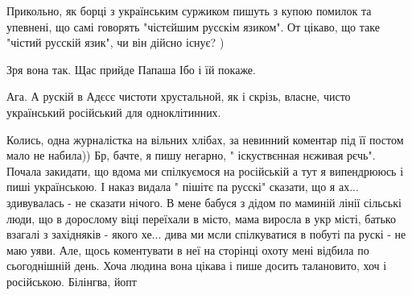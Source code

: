  

Прикольно, як борці з українським суржиком пишуть з купою помилок та упевнені,
що самі говорять "чістєйшим русскім язиком". От цікаво, що таке "чістий русскій
язик", чи він дійсно існує? )


 
Зря вона так. Щас прийде Папаша Ібо і їй покаже.

 
Ага. А рускій в Адєсє чистоти хрустальной, як і скрізь, власне, чисто
український російський для одноклітинних.

 

Колись, одна журналістка на вільних хлібах, за невинний коментар під її постом
мало не набила)) Бр, бачте, я пишу негарно, " іскуствєнная нєживая рєчь".
Почала закидати, що вдома ми спілкуємося на російській а тут я випендрююсь і
пиші українською. І наказ видала " пішітє па русскі" сказати, що я ах...
здивувалась - не сказати нічого. В мене бабуся з дідом по маминій лінії
сільські люди, що в дорослому віці переїхали в місто, мама виросла в укр місті,
батько взагалі з західняків - якого хе... дива ми мсли спілкуватися в побуті па
рускі - не маю уяви. Але, щось коментувати в неї на сторінці охоту мені відбила
по сьогоднішній день. Хоча людина вона цікава і пише досить талановито, хоч і
російською. Білінгва, йопт


 
